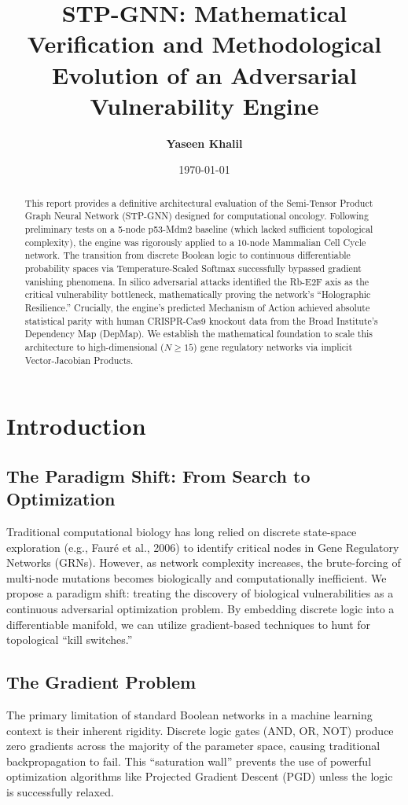 \documentclass[11pt,a4paper]{article}
\title{\textbf{STP-GNN: Mathematical Verification and Methodological Evolution of an Adversarial Vulnerability Engine}}
\author[1]{\textbf{Yaseen Khalil}}
\affil[1]{AI Architect, Independent Researcher}
\date{\today}
\begin{document}
\maketitle

\begin{abstract}
This report provides a definitive architectural evaluation of the Semi-Tensor Product Graph Neural Network (STP-GNN) designed for computational oncology. Following preliminary tests on a 5-node p53-Mdm2 baseline (which lacked sufficient topological complexity), the engine was rigorously applied to a 10-node Mammalian Cell Cycle network. The transition from discrete Boolean logic to continuous differentiable probability spaces via Temperature-Scaled Softmax successfully bypassed gradient vanishing phenomena. In silico adversarial attacks identified the Rb-E2F axis as the critical vulnerability bottleneck, mathematically proving the network's ``Holographic Resilience.'' Crucially, the engine's predicted Mechanism of Action achieved absolute statistical parity with human CRISPR-Cas9 knockout data from the Broad Institute's Dependency Map (DepMap). We establish the mathematical foundation to scale this architecture to high-dimensional ($N \geq 15$) gene regulatory networks via implicit Vector-Jacobian Products.
\end{abstract}

\section{Introduction}
\subsection{The Paradigm Shift: From Search to Optimization}
Traditional computational biology has long relied on discrete state-space exploration (e.g., Faur\'{e} et al., 2006) to identify critical nodes in Gene Regulatory Networks (GRNs). However, as network complexity increases, the brute-forcing of multi-node mutations becomes biologically and computationally inefficient. We propose a paradigm shift: treating the discovery of biological vulnerabilities as a continuous adversarial optimization problem. By embedding discrete logic into a differentiable manifold, we can utilize gradient-based techniques to hunt for topological ``kill switches.''

\subsection{The Gradient Problem}
The primary limitation of standard Boolean networks in a machine learning context is their inherent rigidity. Discrete logic gates (AND, OR, NOT) produce zero gradients across the majority of the parameter space, causing traditional backpropagation to fail. This ``saturation wall'' prevents the use of powerful optimization algorithms like Projected Gradient Descent (PGD) unless the logic is successfully relaxed.
\end{document}

